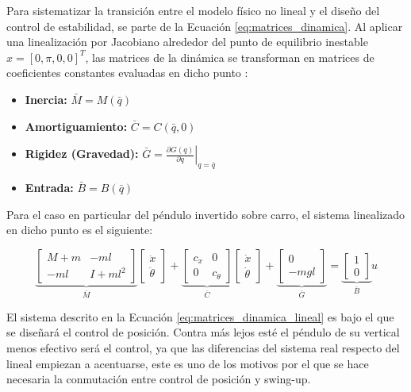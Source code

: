 \documentclass[11pt,fleqn]{book} %
\begin{document}
Para sistematizar la transición entre el modelo físico no lineal y el diseño del control de estabilidad, se parte de la Ecuación \ref{eq:matrices_dinamica}. Al aplicar una linealización por Jacobiano alrededor del punto de equilibrio inestable $x = [0, \pi, 0, 0]^T$, las matrices de la dinámica se transforman en matrices de coeficientes constantes evaluadas en dicho punto \cite{Penarrocha_Tema7}:

\begin{itemize}
	\item \textbf{Inercia:} $\bar{M} = M(\bar{q})$
	\item \textbf{Amortiguamiento:} $\bar{C} = C(\bar{q}, 0)$
	\item \textbf{Rigidez (Gravedad):} $\bar{G} = \left. \frac{\partial G(q)}{\partial q} \right|_{q=\bar{q}}$
	\item \textbf{Entrada:} $\bar{B} = B(\bar{q})$
\end{itemize}

Para el caso en particular del péndulo invertido sobre carro, el sistema linealizado en dicho punto es el siguiente: 

\begin{equation}
	\underbrace{\begin{bmatrix} 
		M + m & -m l \\ 
		-m l  & I + m l^2 
	\end{bmatrix}}_{\bar{M}} 
	\begin{bmatrix} 
		\ddot{x} \\ 
		\ddot{\theta} 
	\end{bmatrix} 
	+ 
	\underbrace{\begin{bmatrix} 
		c_x & 0 \\ 
		0 & c_\theta 
	\end{bmatrix}}_{\bar{C}} 
	\begin{bmatrix} 
		\dot{x} \\ 
		\dot{\theta} 
	\end{bmatrix} 
	+ 
	\underbrace{\begin{bmatrix} 
		0 \\ 
		-m g l 
	\end{bmatrix}}_{\bar{G}} 
	= 
	\underbrace{\begin{bmatrix} 
		1 \\ 
		0 
	\end{bmatrix}}_{\bar{B}} u
	\label{eq:matrices_dinamica_lineal}
\end{equation}

\newpage
El sistema descrito en la Ecuación \ref{eq:matrices_dinamica_lineal} es bajo el que se diseñará el control de posición. Contra más lejos esté el péndulo de su vertical menos efectivo será el control, ya que las diferencias del sistema real respecto del lineal empiezan a acentuarse, este es uno de los motivos por el que se hace necesaria la conmutación entre control de posición y swing-up. 
\end{document}
